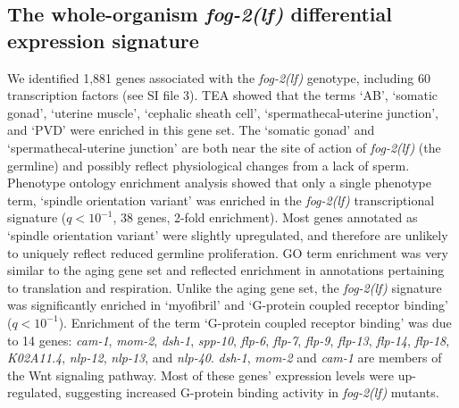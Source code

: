 \documentclass[9pt,twocolumn,twoside]{gsag3jnl}
\newcommand{\fog}{\emph{\mbox{fog-2(lf)}}}
\newcommand{\gene}[1]{\emph{\mbox{#1}}}
\newcommand{\fogn}{1,881}
\newcommand{\tffog}{60}
\begin{document}
\subsection*{The whole-organism \fog{} differential expression signature}
We identified \fogn{} genes associated with the \fog{} genotype, including
\tffog{} transcription factors (see SI file 3). TEA showed that the terms `AB',
`somatic gonad', `uterine muscle', `cephalic sheath cell', `spermathecal-uterine
junction', and `PVD' were enriched in this gene set. The `somatic gonad' and
`spermathecal-uterine junction' are both near the site of action of \fog{} (the
germline) and possibly reflect physiological changes from a lack of sperm.
Phenotype ontology enrichment analysis showed that only a single phenotype term,
`spindle orientation variant' was enriched in the \fog{} transcriptional
signature ($q<10^{-1}$, 38 genes, 2-fold enrichment). Most genes annotated as
`spindle orientation variant' were slightly upregulated, and therefore are
unlikely to uniquely reflect reduced germline proliferation. GO term enrichment
was very similar to the aging gene set and reflected enrichment in annotations
pertaining to translation and respiration. Unlike the aging gene set, the \fog{}
signature was significantly enriched in `myofibril' and `G-protein coupled
receptor binding' ($q<10^{-1}$). Enrichment of the term `G-protein coupled
receptor binding' was due to 14 genes: \gene{cam-1}, \gene{mom-2},
\gene{dsh-1}, \gene{spp-10}, \gene{flp-6}, \gene{flp-7}, \gene{flp-9},
\gene{flp-13}, \gene{flp-14}, \gene{flp-18}, \gene{K02A11.4}, \gene{nlp-12},
\gene{nlp-13}, and \gene{nlp-40}. \gene{dsh-1}, \gene{mom-2} and \gene{cam-1}
are members of the Wnt signaling pathway. Most of these genes' expression levels
were up-regulated, suggesting increased G-protein binding activity in \fog{}
mutants.
\end{document}
